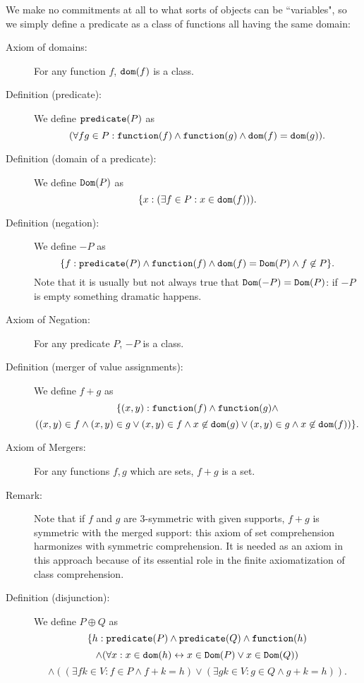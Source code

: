 \documentclass[12pt]{article}
\begin{document}
We make no commitments at all to what sorts of objects can be ``variables", so we simply define a predicate as a class of functions all having the same domain:

\begin{description}

\item[Axiom of domains:]  For any function $f$, ${\tt dom}(f)$ is a class.

\item[Definition (predicate):]  We define ${\tt predicate}(P)$ as $$(\forall fg\in P:{\tt function}(f) \wedge {\tt function}(g) \wedge {\tt dom}(f)={\tt dom}(g)).$$

\item[Definition (domain of a predicate):]  We define ${\tt Dom}(P)$ as $$\{x:(\exists f\in P:x \in {\tt dom}(f))).$$

\item[Definition (negation):]  We define $-P$ as $$\{f:{\tt predicate}(P) \wedge {\tt function}(f) \wedge {\tt dom}(f) = {\tt Dom}(P) \wedge f \not\in P\}.$$  Note that it is usually but not always true that ${\tt Dom}(-P) = {\tt Dom}(P)$:  if $-P$ is empty something dramatic happens.

\item[Axiom of Negation:]  For any predicate $P$, $-P$ is a class.

\item[Definition (merger of value assignments):]  We define $f+g$ as $$\{(x,y):{\tt function}(f) \wedge {\tt function}(g) \wedge$$ $$ ((x,y) \in f \wedge (x,y)\in g \vee (x,y) \in f \wedge x \not\in {\tt dom}(g) \vee (x,y) \in g \wedge x \not\in {\tt dom}(f))\}.$$

\item[Axiom of Mergers:]  For any functions $f,g$ which are sets, $f+g$ is a set.

\item[Remark:]  Note that if $f$ and $g$ are 3-symmetric with given supports, $f+g$ is symmetric with the merged support:  this axiom of set comprehension harmonizes with symmetric comprehension.  It is needed
as an axiom in this approach because of its essential role in the finite axiomatization of class comprehension.

\item[Definition (disjunction):]  We define $P \oplus Q$ as $$\{h:{\tt predicate}(P) \wedge {\tt predicate}(Q) \wedge {\tt function}(h) $$ $$ \wedge (\forall x:x \in {\tt dom}(h) \leftrightarrow x \in {\tt Dom}(P) \vee x \in {\tt Dom}(Q)) $$ $$\wedge ((\exists fk\in V:f \in P \wedge f+k=h) \vee (\exists gk\in V:g \in Q \wedge g+k=h)).$$


\end{description}
\end{document}
